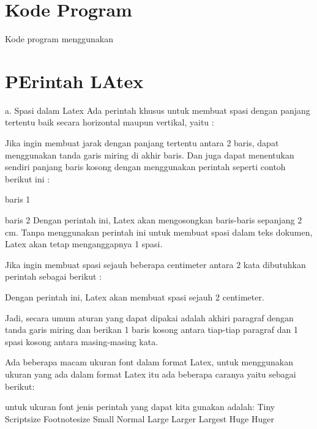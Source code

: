 \section{Kode Program}
Kode program menggunakan 

\section {PErintah LAtex}
a. Spasi dalam Latex
Ada perintah khusus untuk membuat spasi dengan panjang tertentu baik secara horizontal maupun vertikal, yaitu :

Jika ingin membuat jarak dengan panjang tertentu antara 2 baris, dapat menggunakan tanda garis miring di akhir baris. Dan juga dapat menentukan sendiri panjang baris kosong dengan menggunakan perintah seperti contoh berikut ini :

baris 1



baris 2
Dengan perintah ini, Latex akan mengosongkan baris-baris sepanjang 2 cm. Tanpa menggunakan perintah ini untuk membuat spasi dalam teks dokumen, Latex akan tetap menganggapnya 1 spasi.

Jika ingin membuat spasi sejauh beberapa centimeter antara 2 kata dibutuhkan perintah sebagai berikut :

Dengan perintah ini, Latex akan membuat spasi sejauh 2 centimeter.

Jadi, secara umum aturan yang dapat dipakai adalah akhiri paragraf dengan tanda garis miring dan berikan 1 baris kosong antara tiap-tiap paragraf dan 1 spasi kosong antara masing-masing kata.

Ada beberapa macam ukuran font dalam format Latex, untuk menggunakan ukuran yang ada dalam format Latex itu ada beberapa caranya yaitu sebagai berikut:




untuk ukuran font jenis perintah yang dapat kita gunakan adalah:
Tiny
Scriptsize
Footnotesize
Small
Normal
Large
Larger
Largest
Huge
Huger

